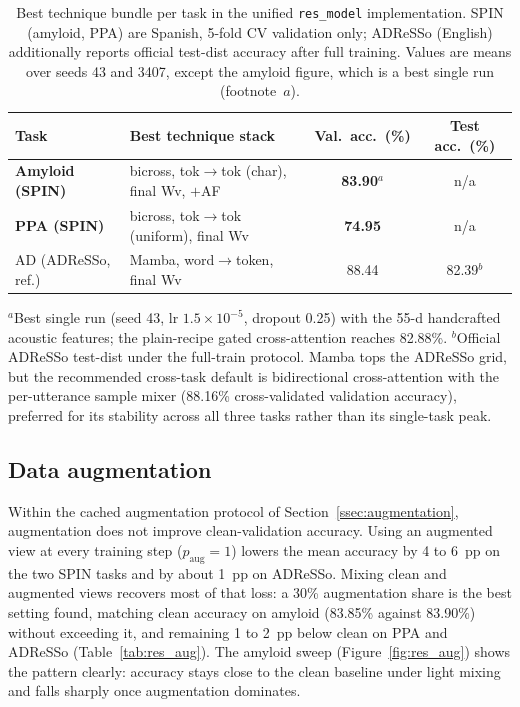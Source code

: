 \begin{table}[htbp]
\centering
\caption[Best technique bundle per task]{Best technique bundle per task in the unified \texttt{res\_model} implementation. SPIN (amyloid, PPA) are Spanish, 5-fold CV validation only; ADReSSo (English) additionally reports official test-dist accuracy after full training. Values are means over seeds 43 and 3407, except the amyloid figure, which is a best single run (footnote~$a$).}
\label{tab:res_best}
\small
\begin{tabular}{llcc}
\toprule
Task & Best technique stack & Val.\ acc.\ (\%) & Test acc.\ (\%) \\
\midrule
\textbf{Amyloid (SPIN)} & bicross, tok$\rightarrow$tok (char), final Wv, $+$AF & \textbf{83.90}$^{a}$ & n/a \\
\textbf{PPA (SPIN)}     & bicross, tok$\rightarrow$tok (uniform), final Wv & \textbf{74.95} & n/a \\
AD (ADReSSo, ref.)      & Mamba, word$\rightarrow$token, final Wv & 88.44 & 82.39$^{b}$ \\
\bottomrule
\end{tabular}

\vspace{2pt}
{\footnotesize $^{a}$Best single run (seed 43, lr $1.5\times10^{-5}$, dropout 0.25) with the 55-d handcrafted acoustic features; the plain-recipe gated cross-attention reaches 82.88\%. $^{b}$Official ADReSSo test-dist under the full-train protocol. Mamba tops the ADReSSo grid, but the recommended cross-task default is bidirectional cross-attention with the per-utterance sample mixer (88.16\% cross-validated validation accuracy), preferred for its stability across all three tasks rather than its single-task peak.}
\end{table}

\subsection{Data augmentation}
\label{ssec:res_augmentation}

Within the cached augmentation protocol of Section~\ref{ssec:augmentation}, augmentation does not improve clean-validation accuracy. Using an augmented view at every training step ($p_{\mathrm{aug}}=1$) lowers the mean accuracy by 4 to 6~pp on the two SPIN tasks and by about 1~pp on ADReSSo. Mixing clean and augmented views recovers most of that loss: a 30\% augmentation share is the best setting found, matching clean accuracy on amyloid (83.85\% against 83.90\%) without exceeding it, and remaining 1 to 2~pp below clean on PPA and ADReSSo (Table~\ref{tab:res_aug}). The amyloid sweep (Figure~\ref{fig:res_aug}) shows the pattern clearly: accuracy stays close to the clean baseline under light mixing and falls sharply once augmentation dominates.


